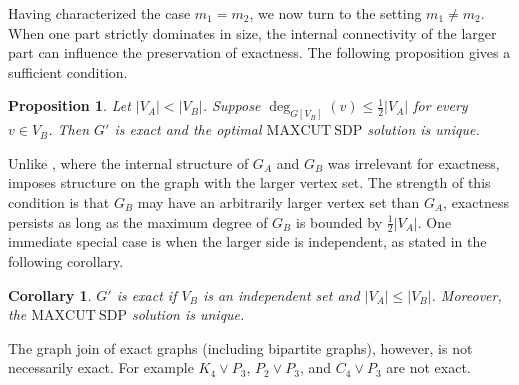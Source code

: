 \documentclass[a4paper,fleqn]{cas-sc}
\newcommand{\1}{\mathbf{1}}
\newtheorem{proposition}[theorem]{Proposition}
\newtheorem{corollary}[theorem]{Corollary}
\newcommand{\ignore}[1]{}
\begin{document}
Having characterized the case $m_1 = m_2$, we now turn to the setting
$m_1 \neq m_2$. When one part strictly dominates in size, the internal
connectivity of the larger part can influence the preservation of exactness.
The following proposition gives a sufficient condition.


\begin{proposition}\label{claim:2}
Let $|V_A| < |V_B|$. Suppose $\deg_{G[V_B]} (v) \leq \tfrac{1}{2}|V_A|$ for every $v \in V_B$. Then $G'$ is exact and the optimal $\mathrm{MAXCUT\ SDP}$ solution is unique.
\end{proposition}

Unlike , where the internal structure of $G_A$ and $G_B$ was irrelevant for exactness,  imposes structure on the graph with the larger vertex set. The strength of this condition is that $G_B$ may have an arbitrarily larger vertex set than $G_A$, exactness persists as long as the maximum degree of $G_B$ is bounded by $\frac{1}{2}|V_A|$. One immediate special case is when the larger side is independent, as stated in the following corollary.

\begin{corollary}\label{roc}
$G'$ is exact if $V_B$ is an independent set and $|V_A| \leq |V_B|$. Moreover, the $\mathrm{MAXCUT\ SDP}$ solution is unique. 
\end{corollary}

\ignore{
We now consider a case where internal structure is imposed on both $G_A$ and $G_B$. We show that if both $G_A$ and $G_B$ contain balanced bipartite spanning subgraph, then exactness persists, however the optimal solution is not unique. 

\begin{proposition}\label{claim:3}
    $G'$ is exact when both $G_A$ and $G_B$ contain balanced complete bipartite spanning subgraphs; that is, $G_A$ contains $K(|V_A|/2,\; |V_A|/2)$ and $G_B$ contains $K(|V_B|/2,\;|V_B|/2)$. Moreover, a higher-rank optimal $\mathrm{MAXCUT\ SDP}$ solution always exists for such $G'$. 
\end{proposition}


\begin{corollary}
    $(G_m \vee H_m) \vee (\mathcal{G}_n \vee \mathcal{H}_n)$ is exact for any graphs $G_m, H_m$ on $m$ vertices and $\mathcal{G}_n, \mathcal{H}_n$  on $n$ vertices, respectively. 
\end{corollary}
}

\begin{remark}
    The graph join of exact graphs (including bipartite graphs), however, is not necessarily exact. For example $K_4 \vee P_3$, $P_2 \vee P_3$, and $C_4 \vee P_3$ are not exact.
\end{remark}
\end{document}
